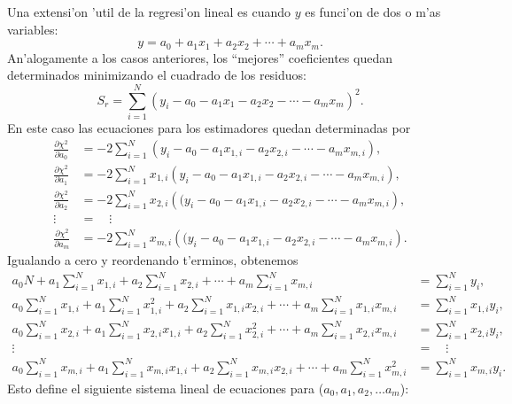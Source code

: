 \documentclass[a4paper]{report}
\begin{document}
Una extensi'on 'util de la regresi'on lineal es cuando $y$ es funci'on de dos o m'as variables:
\begin{equation}
y=a_0 + a_1x_1+a_2x_2+\cdots + a_mx_m.
\end{equation}
An'alogamente a los casos anteriores, los ``mejores'' coeficientes quedan determinados minimizando el cuadrado de los residuos:
\begin{equation}
S_{r}=\sum_{i=1}^N\left(y_i-a_0-a_1x_1-a_2x_2-\cdots -a_mx_m\right)^2.
\end{equation}
En este caso las ecuaciones para los estimadores quedan determinadas por
\begin{align}
\frac{\partial\chi^2}{\partial a_0} &= -2\sum_{i=1}^N \left(y_i-a_0-a_1x_{1,i}-a_2x_{2,i}-\cdots -a_mx_{m,i}\right) ,\\
\frac{\partial\chi^2}{\partial a_1} &= -2\sum_{i=1}^N x_{1,i}\left(y_i-a_0-a_1x_{1,i}-a_2x_{2,i}-\cdots -a_mx_{m,i}\right) ,\\
\frac{\partial\chi^2}{\partial a_2} &= -2\sum_{i=1}^N x_{2,i}\left((y_i-a_0-a_1x_{1,i}-a_2x_{2,i}-\cdots -a_mx_{m,i}\right) ,\\
\vdots\quad &= \quad\vdots \\
\frac{\partial\chi^2}{\partial a_m} &= -2\sum_{i=1}^N x_{m,i}\left((y_i-a_0-a_1x_{1,i}-a_2x_{2,i}-\cdots -a_mx_{m,i}\right) .
\end{align}
Igualando a cero y reordenando t'erminos, obtenemos
\begin{align}
a_0 N + a_1\sum_{i=1}^N x_{1,i} +a_2 \sum_{i=1}^N x_{2,i}+\cdots+a_m \sum_{i=1}^N x_{m,i} &= \sum_{i=1}^N y_i, \\
a_0 \sum_{i=1}^N x_{1,i} + a_1\sum_{i=1}^N x_{1,i}^2 +a_2 \sum_{i=1}^N x_{1,i}x_{2,i}+\cdots  +a_m \sum_{i=1}^N x_{1,i}x_{m,i}&= \sum_{i=1}^N x_{1,i}y_i, \\
a_0 \sum_{i=1}^N x_{2,i} + a_1\sum_{i=1}^N x_{2,i}x_{1,i} +a_2 \sum_{i=1}^N x_{2,i}^2 + \cdots +a_m \sum_{i=1}^N x_{2,i}x_{m,i}&= \sum_{i=1}^N x_{2,i}y_i,\\
\vdots\quad &= \quad\vdots \\
a_0 \sum_{i=1}^N x_{m,i} + a_1\sum_{i=1}^N x_{m,i}x_{1,i} +a_2 \sum_{i=1}^N x_{m,i}x_{2,i} + \cdots +a_m \sum_{i=1}^N x_{m,i}^2&= \sum_{i=1}^N x_{m,i}y_i.
\end{align}
Esto define el siguiente sistema lineal de ecuaciones para ($a_0,a_1,a_2,\dots a_m$):
\end{document}
